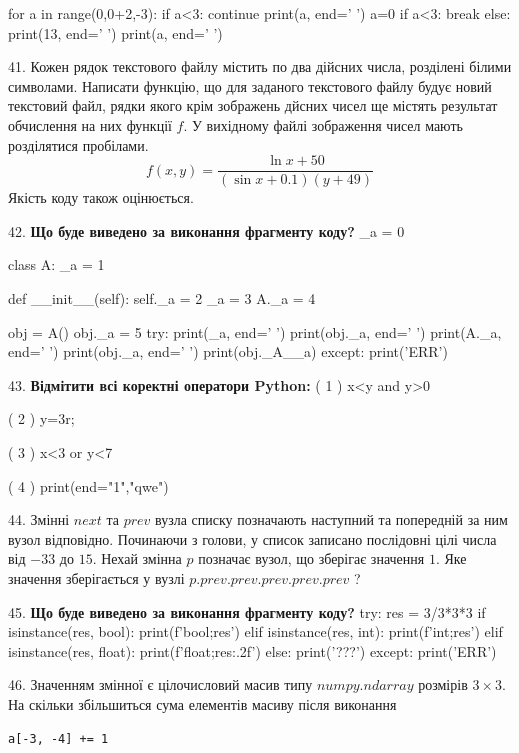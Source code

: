 \documentclass[11pt]{article}
\begin{document}
for a in range(0,0+2,-3):
    if a<3:
        continue
    print(a, end=' ')
    a=0
    if a<3:
        break
else:
    print(13, end=' ')
print(a, end=' ')
\par\vspace{5mm}
41. 
Кожен рядок текстового файлу містить по два дійсних числа, розділені білими символами.
Написати функцію, що для заданого текстового файлу будує новий текстовий файл, рядки якого крім зображень дйсних чисел ще містять результат обчислення на них функції $f$. У вихідному файлі зображення чисел мають розділятися пробілами. 
$$f(x, y) =\frac{\ln x + 50}{(\sin x + 0.1) (y + 49)}$$ 
Якість коду також оцінюється.

\par\vspace{5mm}
42. \textbf{Що буде виведено за виконання фрагменту коду?}
_a = 0

class A:
    _a = 1
    
    def __init__(self):
        self._a = 2
        _a = 3
        A._a = 4

obj = A()
obj._a = 5
try:
    print(_a, end=' ')
    print(obj._a, end=' ')
    print(A._a, end=' ')
    print(obj._a, end=' ')
    print(obj._A__a)
except:
    print('ERR')
\par\vspace{5mm}
43. %
\textbf{Відмітити всі коректні оператори Python:}
( 1 ) x<y and y>0

( 2 ) y=3^^2;

( 3 ) x<3 or y<7

( 4 ) print(end="1","qwe")
\par\vspace{5mm}
44. 
Змінні $next$ та $prev$ вузла списку позначають наступний та попередній за ним вузол відповідно. Починаючи з голови, у список записано послідовні цілі числа від $-33$ до $15$. Нехай змінна $p$ позначає вузол, що зберігає значення $1$.
Яке значення зберігається у вузлі $p.prev.prev.prev.prev.prev$ ?
\par\vspace{5mm}
45. \textbf{Що буде виведено за виконання фрагменту коду?}
try:
    res = 3/3*3*3
    if isinstance(res, bool):
        print(f'bool;{res}')
    elif isinstance(res, int):
        print(f'int;{res}')
    elif isinstance(res, float):
        print(f'float;{res:.2f}')
    else:
        print('???')
except:
    print('ERR')
\par\vspace{5mm}
46. 
Значенням змінної  є цілочисловий масив типу $numpy.ndarray$ розмірів $3{\times}3$. На скільки збільшиться сума елементів масиву  після виконання
\begin{verbatim}
a[-3, -4] += 1
\end{verbatim}
\end{document}
